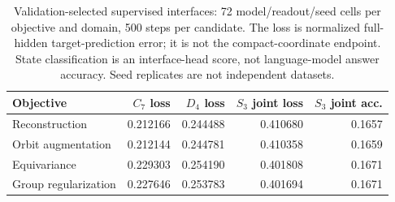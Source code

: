 \begin{table}[htbp]\centering\small
\begin{tabular}{lrrrr}\toprule
Objective & $C_7$ loss & $D_4$ loss & $S_3$ joint loss & $S_3$ joint acc. \\
\midrule
Reconstruction & 0.212166 & 0.244488 & 0.410680 & 0.1657 \\
Orbit augmentation & 0.212144 & 0.244781 & 0.410358 & 0.1659 \\
Equivariance & 0.229303 & 0.254190 & 0.401808 & 0.1671 \\
Group regularization & 0.227646 & 0.253783 & 0.401694 & 0.1671 \\
\bottomrule\end{tabular}
\caption{Validation-selected supervised interfaces: 72 model/readout/seed cells per objective and domain, 500 steps per candidate. The loss is normalized full-hidden target-prediction error; it is not the compact-coordinate endpoint. State classification is an interface-head score, not language-model answer accuracy. Seed replicates are not independent datasets.}
\label{tab:reproduction-interface}\end{table}
